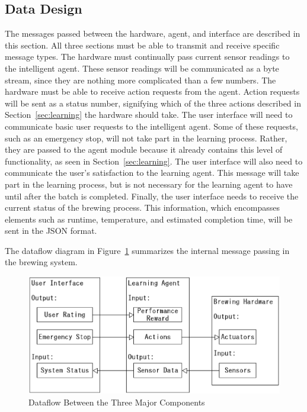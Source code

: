 \documentclass[draftclsnofoot,onecolumn,letterpaper,10pt]{IEEEtran}
\begin{document}
\subsection{Data Design}
The messages passed between the hardware, agent, and interface are described in this section.
All three sections must be able to transmit and receive specific message types.
The hardware must continually pass current sensor readings to the intelligent agent.
These sensor readings will be communicated as a byte stream, since they are nothing more complicated than a few numbers.
The hardware must be able to receive action requests from the agent.
Action requests will be sent as a status number, signifying which of the three actions described in Section~\ref{sec:learning} the hardware should take.
The user interface will need to communicate basic user requests to the intelligent agent.
Some of these requests, such as an emergency stop, will not take part in the learning process.
Rather, they are passed to the agent module because it already contains this level of functionality, as seen in Section~\ref{sec:learning}.
The user interface will also need to communicate the user's satisfaction to the learning agent.
This message will take part in the learning process, but is not necessary for the learning agent to have until after the batch is completed.
Finally, the user interface needs to receive the current status of the brewing process.
This information, which encompasses elements such as runtime, temperature, and estimated completion time, will be sent in the JSON format.

The dataflow diagram in Figure~\ref{fig:dataflow} summarizes the internal message passing in the brewing system.
\begin{figure}[h]
\begin{center}
	\caption{Dataflow Between the Three Major Components \label{fig:dataflow}}
	\includegraphics[width=\linewidth]{dataflow.eps}
\end{center}
\end{figure}
\end{document}
